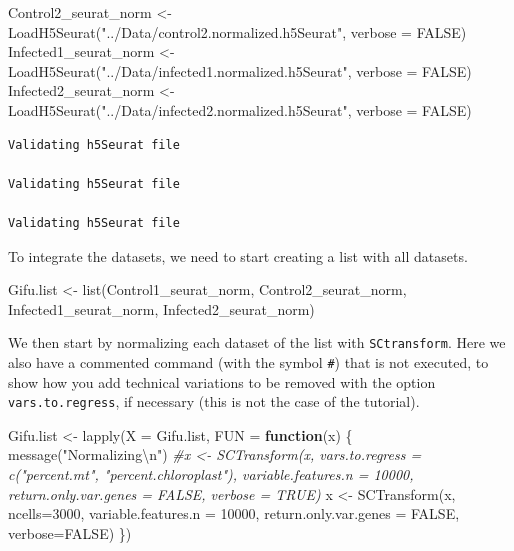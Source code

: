 \documentclass[
  letterpaper,
  DIV=11,
  numbers=noendperiod]{scrartcl}
\newenvironment{Shaded}{\begin{snugshade}}{\end{snugshade}}
\newcommand{\AttributeTok}[1]{\textcolor[rgb]{0.49,0.56,0.16}{#1}}
\newcommand{\CommentTok}[1]{\textcolor[rgb]{0.38,0.63,0.69}{\textit{#1}}}
\newcommand{\ConstantTok}[1]{\textcolor[rgb]{0.53,0.00,0.00}{#1}}
\newcommand{\ControlFlowTok}[1]{\textcolor[rgb]{0.00,0.44,0.13}{\textbf{#1}}}
\newcommand{\DecValTok}[1]{\textcolor[rgb]{0.25,0.63,0.44}{#1}}
\newcommand{\FunctionTok}[1]{\textcolor[rgb]{0.02,0.16,0.49}{#1}}
\newcommand{\NormalTok}[1]{\textcolor[rgb]{0.00,0.44,0.13}{#1}}
\newcommand{\OtherTok}[1]{\textcolor[rgb]{0.00,0.44,0.13}{#1}}
\newcommand{\SpecialCharTok}[1]{\textcolor[rgb]{0.25,0.44,0.63}{#1}}
\newcommand{\StringTok}[1]{\textcolor[rgb]{0.25,0.44,0.63}{#1}}
\begin{document}
\begin{Shaded}
\begin{Highlighting}[]
\NormalTok{Control2\_seurat\_norm }\OtherTok{\textless{}{-}} \FunctionTok{LoadH5Seurat}\NormalTok{(}\StringTok{"../Data/control2.normalized.h5Seurat"}\NormalTok{, }\AttributeTok{verbose =} \ConstantTok{FALSE}\NormalTok{)}
\NormalTok{Infected1\_seurat\_norm }\OtherTok{\textless{}{-}} \FunctionTok{LoadH5Seurat}\NormalTok{(}\StringTok{"../Data/infected1.normalized.h5Seurat"}\NormalTok{, }\AttributeTok{verbose =} \ConstantTok{FALSE}\NormalTok{)}
\NormalTok{Infected2\_seurat\_norm }\OtherTok{\textless{}{-}} \FunctionTok{LoadH5Seurat}\NormalTok{(}\StringTok{"../Data/infected2.normalized.h5Seurat"}\NormalTok{, }\AttributeTok{verbose =} \ConstantTok{FALSE}\NormalTok{)}
\end{Highlighting}
\end{Shaded}

\begin{verbatim}
Validating h5Seurat file

Validating h5Seurat file

Validating h5Seurat file
\end{verbatim}

To integrate the datasets, we need to start creating a list with all
datasets.

\begin{Shaded}
\begin{Highlighting}[]
\NormalTok{Gifu.list }\OtherTok{\textless{}{-}} \FunctionTok{list}\NormalTok{(Control1\_seurat\_norm, }
\NormalTok{                  Control2\_seurat\_norm, }
\NormalTok{                  Infected1\_seurat\_norm, }
\NormalTok{                  Infected2\_seurat\_norm)}
\end{Highlighting}
\end{Shaded}

We then start by normalizing each dataset of the list with
\texttt{SCtransform}. Here we also have a commented command (with the
symbol \texttt{\#}) that is not executed, to show how you add technical
variations to be removed with the option \texttt{vars.to.regress}, if
necessary (this is not the case of the tutorial).

\begin{Shaded}
\begin{Highlighting}[]
\NormalTok{Gifu.list }\OtherTok{\textless{}{-}} \FunctionTok{lapply}\NormalTok{(}\AttributeTok{X =}\NormalTok{ Gifu.list, }\AttributeTok{FUN =} \ControlFlowTok{function}\NormalTok{(x) \{}
  \FunctionTok{message}\NormalTok{(}\StringTok{"Normalizing}\SpecialCharTok{\textbackslash{}n}\StringTok{"}\NormalTok{)}
  \CommentTok{\#x \textless{}{-} SCTransform(x, vars.to.regress = c("percent.mt",  "percent.chloroplast"), variable.features.n = 10000, return.only.var.genes = FALSE, verbose = TRUE)}
\NormalTok{  x }\OtherTok{\textless{}{-}} \FunctionTok{SCTransform}\NormalTok{(x, }\AttributeTok{ncells=}\DecValTok{3000}\NormalTok{, }\AttributeTok{variable.features.n =} \DecValTok{10000}\NormalTok{, }\AttributeTok{return.only.var.genes =} \ConstantTok{FALSE}\NormalTok{, }\AttributeTok{verbose=}\ConstantTok{FALSE}\NormalTok{)}
\NormalTok{\})}
\end{Highlighting}
\end{Shaded}
\end{document}
